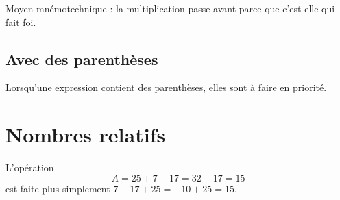 Moyen mnémotechnique : la multiplication passe avant parce que c'est elle qui fait foi.

\subsection{Avec des parenthèses}

\begin{Aretenir}
    Lorsqu'une expression contient des parenthèses, elles sont à faire en priorité.
\end{Aretenir}

\section{Nombres relatifs}

L'opération
\begin{equation}
    A=25+7-17=32-17=15
\end{equation}
est faite plus simplement \( 7-17+25=-10+25=15\).

